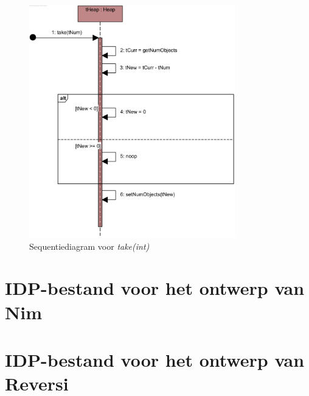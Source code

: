 \begin{figure}[htp]
	\includegraphics[width=0.8\textwidth]{chap-evaluatie/take.png}
	\caption{Sequentiediagram voor \textit{take(int)}}
	\label{fig:nim-take}
\end{figure}

\chapter{IDP-bestand voor het ontwerp van Nim}\label{app:nim-eval}

\label{code:nim-eval}

\chapter{IDP-bestand voor het ontwerp van Reversi}\label{app:reversi-eval}

\label{code:reversi-eval}

%
%


